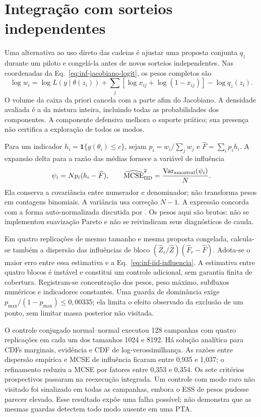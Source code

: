 \section{Integração com sorteios independentes}

Uma alternativa ao uso direto das cadeias é ajustar uma proposta conjunta
\(q_z\) durante um piloto e congelá-la antes de novos sorteios independentes.
Nas coordenadas da Eq.~\eqref{eq:inf-jacobiano-logit}, os pesos completos são
\begin{equation}
 \log w_i=\log L(y\mid\theta(z_i))+
       \sum_j[\log x_{ij}+\log(1-x_{ij})]-\log q_z(z_i).
 \label{eq:inf-peso-iid}
\end{equation}
O volume da caixa da priori cancela com a parte afim do Jacobiano.
A densidade avaliada é a da mistura inteira, incluindo todas as
probabilidades dos componentes. A componente defensiva melhora o suporte
prático; sua presença não certifica a exploração de todos os modos.

Para um indicador \(h_i=\mathbf1\{g(\theta_i)\leq c\}\), sejam
\(p_i=w_i/\sum_jw_j\) e \(\widehat F=\sum_i p_i h_i\). A expansão delta
para a razão das médias fornece a variável de influência
\begin{equation}
 \psi_i=Np_i(h_i-\widehat F),\qquad
 \widehat{\operatorname{MCSE}}_{\rm IID}^2
       =\frac{\operatorname{Var}_{\rm amostral}(\psi_i)}{N}.
 \label{eq:inf-iid-influencia}
\end{equation}
Ela conserva a covariância entre numerador e denominador; não transforma
pesos em contagens binomiais. A variância usa correção \(N-1\).
A expressão concorda com a forma auto-normalizada discutida por
\textcite{vehtari2024psis}. Os pesos aqui são brutos: não se implementou
suavização Pareto e não se reivindicam seus diagnósticos de cauda.

Em quatro replicações de mesmo tamanho e mesma proposta congelada,
calcula-se também a dispersão das influências de bloco
\((\widehat Z_r/\widehat Z)(\widehat F_r-\widehat F)\).
Adota-se o maior erro entre essa estimativa e a Eq.~\eqref{eq:inf-iid-influencia}.
A estimativa entre quatro blocos é instável e constitui um controle
adicional, sem garantia finita de cobertura. Registram-se concentração
dos pesos, peso máximo, subfluxos numéricos e indicadores constantes.
Uma guarda de dominância exige
\(p_{\max}/(1-p_{\max})\leq0{,}00335\); ela limita o efeito observado
da exclusão de um ponto, sem limitar massa posterior não visitada.

O controle conjugado normal--normal executou 128 campanhas com quatro
replicações em cada um dos tamanhos 1024 e 8192. Há solução analítica para
CDFs marginais, evidência e CDF de log-verossimilhança. As razões entre
dispersão empírica e MCSE de influência ficaram entre 0,935 e 1,037;
o refinamento reduziu a MCSE por fatores entre 0,353 e 0,354.
Os sete critérios prospectivos passaram na reexecução integrada.
Um controle com modo raro não visitado foi sinalizado em todas as
campanhas, embora o ESS de pesos pudesse parecer elevado. Esse resultado
expõe uma falha possível; não demonstra que as mesmas guardas detectem
todo modo ausente em uma PTA.

